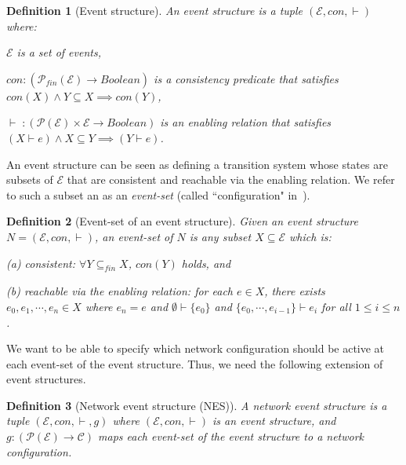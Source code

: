 \documentclass[pldi-cameraready]{sigplanconf}
\newcommand{\fin}{\ensuremath{\mathit{fin}}}
\newtheorem{definition}{Definition}
\begin{document}
\begin{definition}[Event structure]
\label{def:event_struct}
An event structure is a tuple $(\mathcal{E},con,\vdash)$ where:
\begin{compactitem}
\item $\mathcal{E}$ is a set of events, 
\item $con : (\mathcal{P}_{\fin}(\mathcal{E}) \rightarrow Boolean)$ is a
  consistency predicate that satisfies $con(X) \land Y \subseteq X
  \implies con(Y)$, \item $\vdash\; : (\mathcal{P}(\mathcal{E}) \times \mathcal{E}
  \rightarrow Boolean)$ is an enabling relation that satisfies $(X
  \vdash e) \land X \subseteq Y \implies (Y \vdash e)$.
\end{compactitem}
\end{definition}

\noindent An event structure can be seen as defining a transition
system whose states are subsets of $\mathcal{E}$
that are
consistent and reachable via the enabling relation. We refer to such a
subset an as an {\em event-set} (called ``configuration"
in~\cite{winskel1987event}).

\begin{definition}[Event-set of an event structure]
\label{def:event_struct_config}
Given an event structure $N = (\mathcal{E},con,\vdash)$, an {\em
  event-set} of $N$ is any subset $X \subseteq \mathcal{E}$ which is:
\begin{inparaenum}
\item[(a)] consistent: $\forall Y \subseteq_\fin X$, $con(Y)$ holds, and
\item[(b)] reachable via the enabling relation: for each $e \in X$, there
  exists $e_0,e_1,\cdots,e_n \in X$ where $e_n = e$ and $\emptyset \vdash \{e_0\}$ and
  $\{e_0,\cdots,e_{i-1}\} \vdash e_i$ for all $1 \leq i \leq n$. 
\end{inparaenum}
\end{definition}

We want to be able to specify which network configuration should be
active at each event-set of the event structure.  Thus, we need the
following extension of event structures.


\begin{definition}[Network event structure (NES)]
A {\em network event structure} is a tuple
$(\mathcal{E},con,\vdash,g)$ where
$(\mathcal{E},con,\vdash)$ is an event structure, and
$g : (\mathcal{P}(\mathcal{E}) \rightarrow \mathcal{C})$ maps each
event-set of the event structure to a network configuration.
\end{definition}
\end{document}
